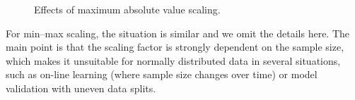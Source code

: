 \begin{figure}[htpb]
  \centering
  \hspace{1cm}
  \caption{%
    Effects of maximum absolute value scaling.
  }
\end{figure}

For min--max scaling, the situation is similar and we omit the details here.
The main point is that the scaling factor is strongly dependent on the sample size, which makes it unsuitable for normally distributed data in several situations, such as on-line learning (where sample size changes over time) or model validation with uneven data splits.
